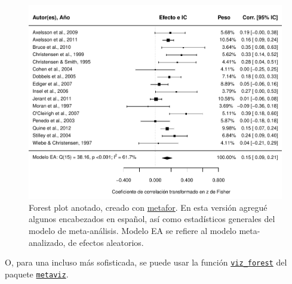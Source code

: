 \documentclass[
  bookmarksnumbered]{article}
\begin{document}
\begin{figure}
\centering
\includegraphics{Meta-analysis_files/figure-latex/for-plot2-1.pdf}
\caption{\label{fig:for-plot2}Forest plot anotado, creado con \href{https://www.metafor-project.org/doku.php}{metafor}. En esta versión agregué algunos encabezados en español, así como estadísticos generales del modelo de meta-análisis. Modelo EA se refiere al modelo meta-analizado, de efectos aleatorios.}
\end{figure}

O, para una incluso más sofisticada, se puede usar la función \href{https://cran.r-project.org/web/packages/metaviz/vignettes/metaviz.html\#creating-forest-plots-with-function-viz_forest}{\texttt{viz\_forest}} del paquete \href{https://cran.r-project.org/web/packages/metaviz/vignettes/metaviz.html}{\texttt{metaviz}}.
\end{document}
